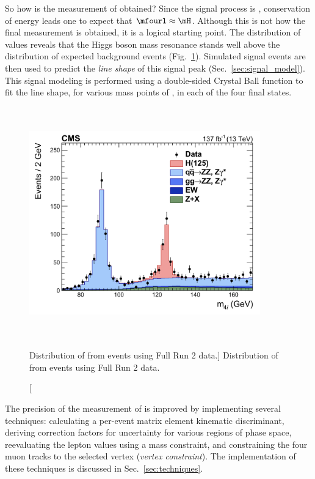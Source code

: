 So how is the measurement of \mH obtained?
Since the signal process is \hzzfourl, conservation of energy leads one to expect that $\mfourl \approx \mH$.
Although this is not how the final measurement is obtained, it is a logical starting point.
The distribution of \mfourl values reveals that the Higgs boson mass resonance stands well above the distribution of expected background events (Fig.~\ref{fig:m4l_run2}).
Simulated signal events are then used to predict the \emph{line shape} of this signal peak (Sec.~\ref{sec:signal_model}).
This signal modeling is performed using a double-sided Crystal Ball function to fit the line shape, for various mass points of \mH, in each of the four final states.
\begin{figure}[pbth]
    \centering
    \includegraphics[width=10cm,height=10cm,keepaspectratio]{figures/higgsmassmeas/m4l_FullRun2_epjc.jpeg}
		\caption
			[Distribution of \mfourl from \hzzfourl events using Full Run 2 data.]
			{Distribution of \mfourl from \hzzfourl events using Full Run 2 data.}
        \label{fig:m4l_run2}
\end{figure}

The precision of the measurement of \mH is improved by implementing several techniques:
calculating a per-event matrix element kinematic discriminant,
deriving correction factors for \mfourl uncertainty for various regions of phase space,
reevaluating the lepton \pt values using a \Zone mass constraint,
and constraining the four muon tracks to the selected vertex (\emph{vertex constraint}).
The implementation of these techniques is discussed in Sec.~\ref{sec:techniques}.

